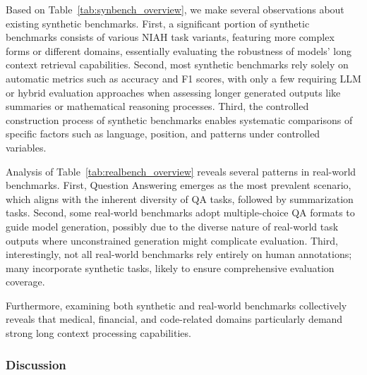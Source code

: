 \documentclass[11pt, a4paper, logo, copyright, nonumbering]{map}
\begin{document}
Based on Table~\ref{tab:synbench_overview}, we make several observations about existing synthetic benchmarks. First, a significant portion of synthetic benchmarks consists of various NIAH task variants, featuring more complex forms or different domains, essentially evaluating the robustness of models' long context retrieval capabilities. Second, most synthetic benchmarks rely solely on automatic metrics such as accuracy and F1 scores, with only a few requiring LLM or hybrid evaluation approaches when assessing longer generated outputs like summaries or mathematical reasoning processes. Third, the controlled construction process of synthetic benchmarks enables systematic comparisons of specific factors such as language, position, and patterns under controlled variables.

Analysis of Table~\ref{tab:realbench_overview} reveals several patterns in real-world benchmarks. First, Question Answering emerges as the most prevalent scenario, which aligns with the inherent diversity of QA tasks, followed by summarization tasks. Second, some real-world benchmarks adopt multiple-choice QA formats to guide model generation, possibly due to the diverse nature of real-world task outputs where unconstrained generation might complicate evaluation. Third, interestingly, not all real-world benchmarks rely entirely on human annotations; many incorporate synthetic tasks, likely to ensure comprehensive evaluation coverage.

Furthermore, examining both synthetic and real-world benchmarks collectively reveals that medical, financial, and code-related domains particularly demand strong long context processing capabilities.

\subsubsection{Discussion}
\label{sec:ueval_benchmarks_discuss}
\end{document}
